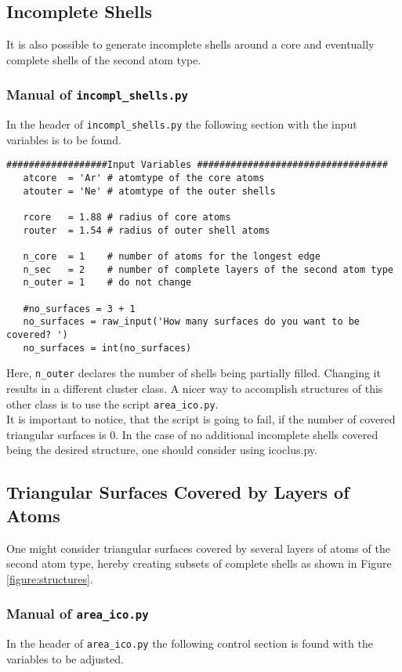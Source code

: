 \subsection{Incomplete Shells}
It is also possible to generate incomplete shells around a core and
eventually complete shells of the second atom type.

\subsubsection{Manual of \lstinline|incompl_shells.py|}
In the header of \verb|incompl_shells.py| the following section
with the
input variables is to be found.

\begin{lstlisting}
##################Input Variables ##################################
   atcore  = 'Ar' # atomtype of the core atoms
   atouter = 'Ne' # atomtype of the outer shells
   
   rcore   = 1.88 # radius of core atoms
   router  = 1.54 # radius of outer shell atoms
   
   n_core  = 1    # number of atoms for the longest edge
   n_sec   = 2    # number of complete layers of the second atom type
   n_outer = 1    # do not change
   
   #no_surfaces = 3 + 1
   no_surfaces = raw_input('How many surfaces do you want to be covered? ')
   no_surfaces = int(no_surfaces)
\end{lstlisting}
Here, \verb|n_outer| declares the number of shells being
partially filled. Changing it results in a different cluster class.
A nicer way to accomplish structures of this other class is to use the
script \verb|area_ico.py|.\\
It is important to notice, that the script is going to fail,
if the number of covered triangular surfaces is 0. In the case of
no additional incomplete shells covered being the desired structure,
one should consider using icoclus.py.


\subsection{Triangular Surfaces Covered by Layers of Atoms}
One might consider triangular surfaces covered by several layers of
atoms of the second atom type, hereby creating subsets of complete
shells as shown in Figure \ref{figure:structures}.

\subsubsection{Manual of \lstinline|area_ico.py|}
In the header of \verb|area_ico.py| the following control section
is found with the variables to be adjusted.

